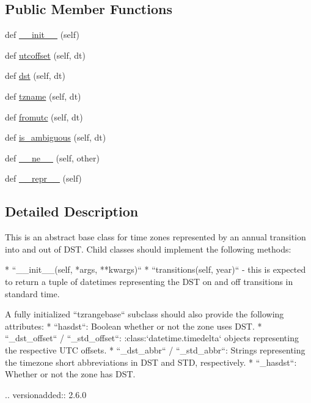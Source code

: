 \subsection*{Public Member Functions}
\begin{DoxyCompactItemize}
\item 
def \hyperlink{classdateutil_1_1tz_1_1__common_1_1tzrangebase_ac2ff7b30f756aa02fdd11cb4f91b9629}{\+\_\+\+\_\+init\+\_\+\+\_\+} (self)
\item 
def \hyperlink{classdateutil_1_1tz_1_1__common_1_1tzrangebase_a34a480a4f72d926e9cf84d734aca45ce}{utcoffset} (self, dt)
\item 
def \hyperlink{classdateutil_1_1tz_1_1__common_1_1tzrangebase_a9a41064a1db54842dd7ac12e335e34f5}{dst} (self, dt)
\item 
def \hyperlink{classdateutil_1_1tz_1_1__common_1_1tzrangebase_a5ca95f20b60e1e9b43479ffaff55653f}{tzname} (self, dt)
\item 
def \hyperlink{classdateutil_1_1tz_1_1__common_1_1tzrangebase_a11bed1ed28dbf29eca50eea0718edce4}{fromutc} (self, dt)
\item 
def \hyperlink{classdateutil_1_1tz_1_1__common_1_1tzrangebase_a5a73d01b931cf74cb138dc443be487c6}{is\+\_\+ambiguous} (self, dt)
\item 
def \hyperlink{classdateutil_1_1tz_1_1__common_1_1tzrangebase_a6d597d930bb792d7480f9d714a3aeefc}{\+\_\+\+\_\+ne\+\_\+\+\_\+} (self, other)
\item 
def \hyperlink{classdateutil_1_1tz_1_1__common_1_1tzrangebase_a859f6b592cfb6dfd33ebefead1e7edad}{\+\_\+\+\_\+repr\+\_\+\+\_\+} (self)
\end{DoxyCompactItemize}


\subsection{Detailed Description}
\begin{DoxyVerb}This is an abstract base class for time zones represented by an annual
transition into and out of DST. Child classes should implement the following
methods:

    * ``__init__(self, *args, **kwargs)``
    * ``transitions(self, year)`` - this is expected to return a tuple of
      datetimes representing the DST on and off transitions in standard
      time.

A fully initialized ``tzrangebase`` subclass should also provide the
following attributes:
    * ``hasdst``: Boolean whether or not the zone uses DST.
    * ``_dst_offset`` / ``_std_offset``: :class:`datetime.timedelta` objects
      representing the respective UTC offsets.
    * ``_dst_abbr`` / ``_std_abbr``: Strings representing the timezone short
      abbreviations in DST and STD, respectively.
    * ``_hasdst``: Whether or not the zone has DST.

.. versionadded:: 2.6.0
\end{DoxyVerb}
 

